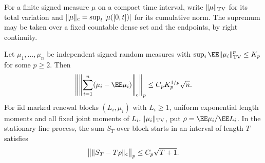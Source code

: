 \documentclass[11pt,letterpaper]{article}
\begin{document}
For a finite signed measure $\mu$ on a compact time interval,
write $\|\mu\|_{\rm TV}$ for its total variation and
$\|\mu\|_{\rm c}=\sup_t|\mu([0,t])|$ for its cumulative norm.
The supremum may be taken over a fixed countable dense set and
the endpoints, by right continuity.

\begin{lemma}
\label{lem:random-measure-maximal}
Let $\mu_1,\ldots,\mu_n$ be independent signed random measures
with $\sup_i\EE\|\mu_i\|_{\rm TV}^p\le K_p$ for some $p\ge2$.
Then
\begin{equation}\label{eq:random-measure-maximal}
 \left\|\left\|\sum_{i=1}^n(\mu_i-\EE\mu_i)\right\|_{\rm c}
                                      \right\|_p
                         \le C_p K_p^{1/p}\sqrt n.
\end{equation}
For iid marked renewal blocks $(L_i,\mu_i)$ with $L_i\ge1$,
uniform exponential length moments and all fixed joint moments
of $L_i,\|\mu_i\|_{\rm TV}$, put
$\rho=\EE\mu_i/\EE L_i$.
In the stationary line process, the sum $S_T$ over block starts
in an interval of length $T$ satisfies
\begin{equation}\label{eq:renewal-measure-maximal}
 \bigl\|\|S_T-T\rho\|_{\rm c}\bigr\|_p\le C_p\sqrt{T+1}.
\end{equation}
\end{lemma}
\end{document}
